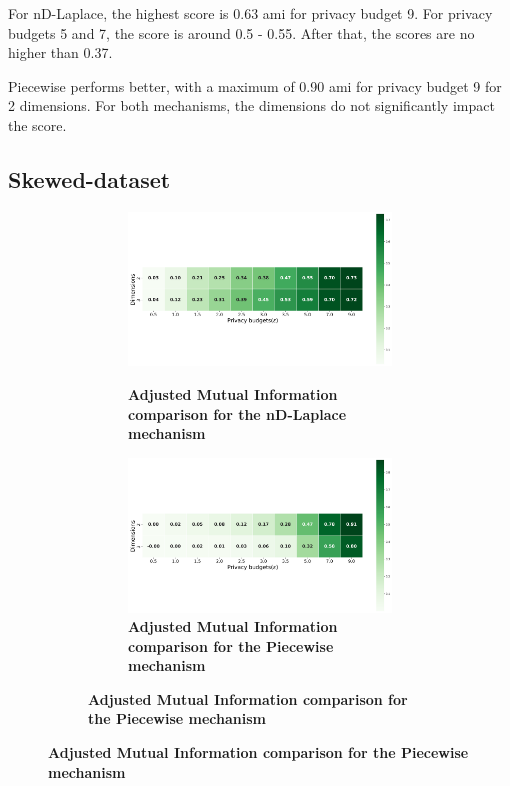 {  For nD-Laplace, the highest score is 0.63 \gls{ami} for privacy budget 9. For privacy budgets 5 and 7, the score is around 0.5 - 0.55. After that, the scores are no higher than 0.37.

  Piecewise performs better, with a maximum of 0.90 \gls{ami} for privacy budget 9 for 2 dimensions. For both mechanisms, the dimensions do not significantly impact the score.
  \newpage
  \subsection{Skewed-dataset}
  \begin{figure}[H]
    \centering
    \begin{subfigure}[b]{0.85\textwidth}
      \begin{subfigure}[c]{1\textwidth}
        \caption{\textbf{Adjusted Mutual Information comparison for the nD-Laplace mechanism}}
        \includegraphics[width=1\textwidth]{Results/nd-laplace/nd-Laplace/skewed-dataset/ami.png}
        \label{fig:ami_skewed-dataset_comparison_kdlaplace_2d}
      \end{subfigure}
      \vfill %
      \begin{subfigure}[c]{1\textwidth}
        \caption{\textbf{Adjusted Mutual Information comparison for the Piecewise mechanism}}
        \includegraphics[width=1\textwidth]{Results/nd-laplace/piecewise/skewed-dataset/ami.png}

\end{subfigure}
\end{subfigure}
\end{figure}}
